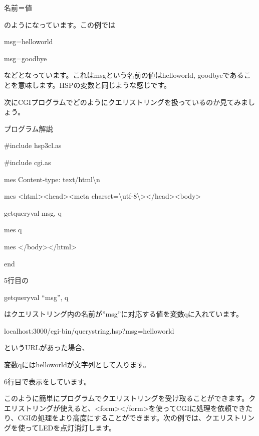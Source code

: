 \documentclass[a4paper,12pt,dvipdfmx]{jarticle}
\begin{document}
名前＝値

のようになっています。この例では

msg=helloworld

msg=goodbye

などとなっています。これはmsgという名前の値はhelloworld,
goodbyeであることを意味します。HSPの変数と同じような感じです。

次にCGIプログラムでどのようにクエリストリングを扱っているのか見てみましょう。


\bigskip

プログラム解説



\centering
\begin{boxedminipage}{16.233cm}
\#include {\textquotedbl}hsp3cl.as{\textquotedbl}

\#include {\textquotedbl}cgi.as{\textquotedbl}

mes {\textquotedbl}Content-type: text/html{\textbackslash}n{\textquotedbl}

mes {\textquotedbl}{\textless}html{\textgreater}{\textless}head{\textgreater}{\textless}meta
charset={\textbackslash}{\textquotedbl}utf-8{\textbackslash}{\textquotedbl}{\textgreater}{\textless}/head{\textgreater}{\textless}body{\textgreater}{\textquotedbl}

getqueryval {\textquotedbl}msg{\textquotedbl}, q

mes q

mes {\textquotedbl}{\textless}/body{\textgreater}{\textless}/html{\textgreater}{\textquotedbl}

end
\end{boxedminipage}
\flushleft


\bigskip


\bigskip

5行目の

getqueryval “msg”, q

はクエリストリング内の名前が”msg”に対応する値を変数qに入れています。

localhost:3000/cgi-bin/querystring.hsp?msg=helloworld

というURLがあった場合、

変数qにはhelloworldが文字列として入ります。

6行目で表示をしています。

このように簡単にプログラムでクエリストリングを受け取ることができます。クエリストリングが使えると、{\textless}form{\textgreater}{\textless}/form{\textgreater}を使ってCGIに処理を依頼できたり、CGIの処理をより高度にすることができます。次の例では、クエリストリングを使ってLEDを点灯消灯します。
\end{document}
